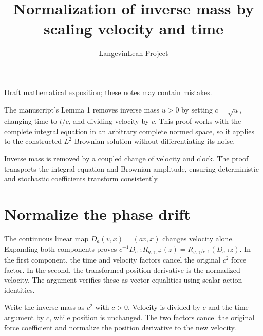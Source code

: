\documentclass[11pt,a4paper]{article}
\title{\texorpdfstring{Normalization of inverse mass by scaling velocity and time}{Normalization of inverse mass by scaling velocity and time}}
\author{LangevinLean Project}
\date{}
\begin{document}
\maketitle
Draft mathematical exposition; these notes may contain mistakes.


The manuscript’s Lemma 1 removes inverse mass \(u>0\) by setting \(c=\sqrt u\), changing time to \(t/c\), and dividing velocity by \(c\). This proof works with the complete integral equation in an arbitrary complete normed space, so it applies to the constructed \(L^{2}\) Brownian solution without differentiating its noise.



Inverse mass is removed by a coupled change of velocity and clock. The proof transports the integral equation and Brownian amplitude, ensuring deterministic and stochastic coefficients transform consistently.


\section{\texorpdfstring{Normalize the phase drift}{Normalize the phase drift}}


The continuous linear map \(D_a(v,x)=(av,x)\) changes velocity alone. Expanding both components proves \(c^{-1}D_{c^{-1}}R_{g,\gamma,c^2}(z)=R_{g,\gamma/c,1}(D_{c^{-1}}z)\). In the first component, the time and velocity factors cancel the original \(c^2\) force factor. In the second, the transformed position derivative is the normalized velocity. The argument verifies these as vector equalities using scalar action identities.



Write the inverse mass as \(c^2\) with \(c>0\). Velocity is divided by \(c\) and the time argument by \(c\), while position is unchanged. The two factors cancel the original force coefficient and normalize the position derivative to the new velocity.
\end{document}
